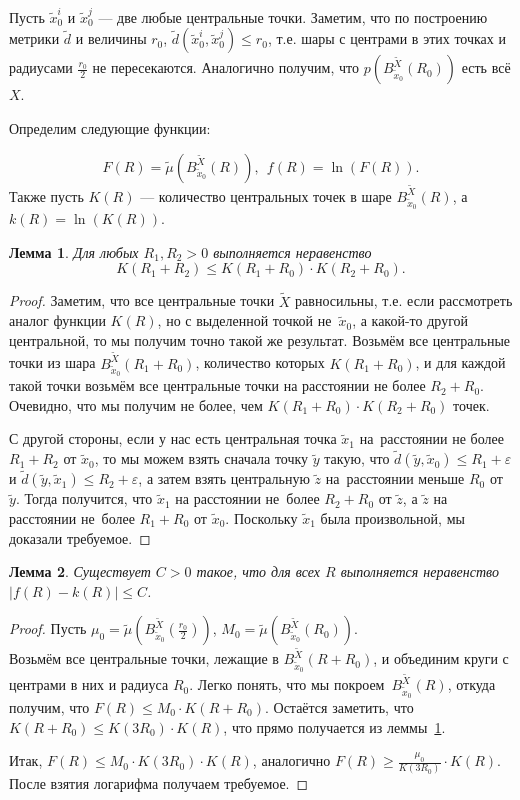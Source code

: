 \documentclass[11pt]{article}
\theoremstyle{definition}
\theoremstyle{plain}
\theoremstyle{plain}
\newtheorem{lemma}{Лемма}
\def\leq{\leqslant}
\def\geq{\geqslant}
\def\wt#1{\widetilde{#1}}
\def\wtB#1{B_{\wt{x}_0}^{\wt{X}}(#1)}
\begin{document}
Пусть $\wt{x}_0^i$ и $\wt{x}_0^j$ --- две любые центральные точки.
Заметим, что по построению метрики $\wt{d}$ и величины $r_0$, $\wt{d}(\wt{x}_0^i, \wt{x}_0^j) \leq r_0$, т.е. шары
с центрами в этих точках и радиусами $\frac{r_0}{2}$ не пересекаются.
Аналогично получим, что $p \left(B_{\wt{x}_0}^{\wt{X}} (R_0) \right)$ есть всё $X$.



Определим следующие функции:

$$
F(R)=\wt{\mu}\left(B_{\wt{x}_0}^{\wt{X}}(R)\right),~~
f(R)=\ln(F(R)).
$$
Также пусть $K(R)$ --- количество центральных точек в шаре $B_{\wt{x}_0}^{\wt{X}} (R)$, а $k(R) = \ln(K(R))$.

\begin{lemma}\label{l_K_1}
Для любых $R_1, R_2 > 0$ выполняется неравенство 
$$
K(R_1 + R_2) \leq K(R_1+R_0) \cdot K(R_2+R_0).
$$
\end{lemma}

\begin{proof}
Заметим, что все центральные точки $\wt{X}$ равносильны, т.е. если рассмотреть аналог функции $K(R)$, но с выделенной точкой не~$\wt{x}_0$, 
а какой-то другой центральной, то мы получим точно такой же результат. 
Возьмём все центральные точки из шара $\wtB{R_1 + R_0}$, количество которых $K(R_1 + R_0)$,
и для каждой такой точки возьмём все центральные точки на расстоянии не более $R_2 + R_0$. 
Очевидно, что мы получим не более, чем $K(R_1+R_0) \cdot K(R_2+R_0)$ точек. 

С другой стороны, если у нас есть центральная точка $\wt{x}_1$ на~расстоянии не более $R_1 + R_2$ от $\wt{x}_0$, то мы можем взять сначала точку 
$\wt{y}$ такую, что $\wt{d}(\wt{y}, \wt{x}_0) \leq R_1 + \varepsilon$ и $\wt{d}(\wt{y}, \wt{x}_1) \leq R_2 + \varepsilon$,
а затем взять центральную $\wt{z}$ на~расстоянии меньше $R_0$ от $\wt{y}$. 
Тогда получится, что $\wt{x}_1$ на расстоянии не~более $R_2 + R_0$ от $\wt{z}$, а $\wt{z}$ на расстоянии не~более $R_1 + R_0$ от $\wt{x}_0$.
Поскольку $\wt{x}_1$ была произвольной, мы доказали требуемое.
\end{proof}

\begin{lemma}\label{l_K_2}
Существует $C > 0$ такое, что для всех $R$ выполняется неравенство  $|f(R) - k(R)| \leq C$.
\end{lemma}

\begin{proof}
Пусть $\mu_0 =  \wt{\mu}\left( B_{\wt{x}_0}^{\wt{X}}(\frac{r_0}{2}) \right)$, 
$M_0 =  \wt{\mu}\left( B_{\wt{x}_0}^{\wt{X}}(R_0) \right)$.\\
Возьмём все центральные точки, лежащие в $B_{\wt{x}_0}^{\wt{X}}(R + R_0)$, 
и объединим круги с центрами в них и радиуса $R_0$. Легко понять, что мы покроем~$B_{\wt{x}_0}^{\wt{X}}(R)$, откуда получим, 
что $F(R) \leq M_0\cdot K(R + R_0)$. Остаётся заметить, что $K(R + R_0) \leq K(3 R_0) \cdot K(R)$, что прямо получается из леммы~\ref{l_K_1}. 

Итак, $F(R) \leq M_0\cdot K(3 R_0) \cdot K(R)$, аналогично $F(R) \geq \frac{\mu_0}{K(3 R_0)}\cdot K(R)$. 
После взятия логарифма получаем требуемое.
\end{proof}
\end{document}
